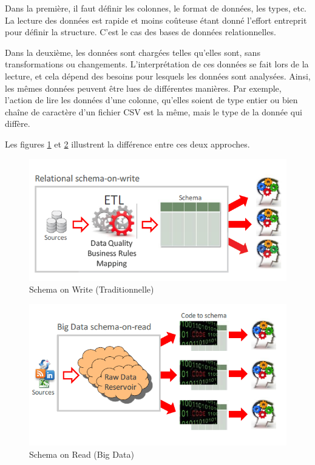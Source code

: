 		Dans la première, il faut définir les colonnes, le format de données, les types, etc. La lecture des données est rapide et moins coûteuse étant donné l'effort entreprit pour définir la structure. C'est le cas des bases de données relationnelles.
		
		Dans la deuxième, les données sont chargées telles qu'elles sont, sans transformations ou changements. L'interprétation de ces données se fait lors de la lecture, et cela dépend des besoins pour lesquels les données sont analysées. Ainsi, les mêmes données peuvent être lues de différentes manières. Par exemple, l'action  de lire les données  d'une colonne, qu'elles soient de type entier ou bien chaîne de caractère d'un fichier CSV est la même, mais le type de la donnée qui diffère.
		
		 Les figures \ref{fig:on-write} et \ref{fig:on-read} illustrent la différence entre ces deux approches.
		\begin{figure}[H]
			\centering
			\includegraphics[width=0.8\linewidth]{illustrations/on-write}
			\caption{Schema on Write (Traditionnelle)}
			\label{fig:on-write}
		\end{figure}
		\begin{figure}[H]
			\centering
			\captionsetup{justification=centering}
			\includegraphics[width=0.8\linewidth]{illustrations/on-read}
			\caption{Schema on Read (Big Data)}
			\label{fig:on-read}
		\end{figure}
		
